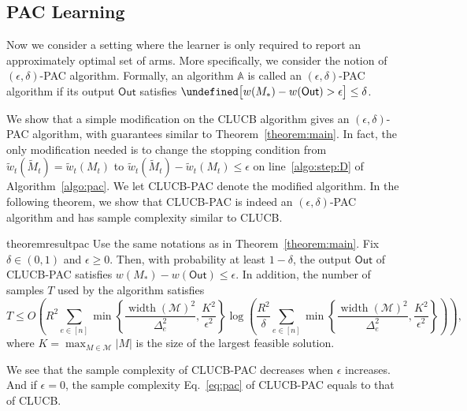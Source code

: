 \documentclass{article}
\newcommand{\Algorithm}{{\small \textsf{CLUCB}}\xspace}
\newcommand{\AlgorithmPAC}{{\small \textsf{CLUCB-PAC}}\xspace}
\newcommand{\M}{\mathcal M}
\DeclareMathOperator{\rank}{width}
\newcommand{\out}{\mathsf{Out}}
\let\Pr\undefined
\DeclareMathOperator{\Pr}{Pr}
\begin{document}
\subsection{PAC Learning}
Now we consider a setting where the learner is only required to report an approximately optimal set of arms. 
More specifically, we consider the notion of $(\epsilon,\delta)$-PAC algorithm.
Formally, an algorithm $\mathbb A$ is called an $(\epsilon,\delta)$-PAC algorithm if its output $\out$ satisfies $\Pr\big[w(M_*)-w(\out) > \epsilon\big] \le \delta$.

We show that a simple modification on the \Algorithm algorithm gives an $(\epsilon,\delta)$-PAC algorithm, with guarantees similar  to Theorem~\ref{theorem:main}.
In fact, the only modification needed is to change the stopping condition from $\tilde w_t(\tilde M_t) = \tilde w_t(M_t)$ to $\tilde w_t(\tilde M_t)-\tilde w_t(M_t) \le \epsilon$ on line~\ref{algo:step:D} of Algorithm~\ref{algo:pac}.
We let  \AlgorithmPAC denote the modified algorithm.
In the following theorem, we show that \AlgorithmPAC is indeed an $(\epsilon,\delta)$-PAC algorithm and has sample complexity similar to \Algorithm.
\begin{restatable}{theorem}{resultpac}
Use the same notations as in Theorem~\ref{theorem:main}.
Fix $\delta\in(0,1)$ and $\epsilon \ge 0$.
Then, with probability at least $1-\delta$, the output $\out$ of \AlgorithmPAC satisfies
$
w(M_*)-w(\out) \le \epsilon.
$
In addition, the number of samples $T$ used by the algorithm satisfies
\begin{equation}
T \le 
O\left(R^2\sum_{e\in [n]} \min\left\{\frac{\rank(\M)^2}{\Delta_e^2}, \frac{K^2}{\epsilon^2}\right\} 
\log\left(\frac{R^2}\delta \sum_{e\in [n]} \min\left\{\frac{\rank(\M)^2}{\Delta_e^2}, \frac{K^2}{\epsilon^2}\right\}\right)\right),
\label{eq:pac}
\end{equation}
where $K=\max_{M\in \M} |M|$ is the size of the largest feasible solution.
\label{theorem:pac}
\end{restatable}
We see that the sample complexity of \AlgorithmPAC decreases when $\epsilon$ increases.
And if $\epsilon=0$, the sample complexity Eq.~\eqref{eq:pac} of \AlgorithmPAC equals to that of \Algorithm. 
\end{document}
